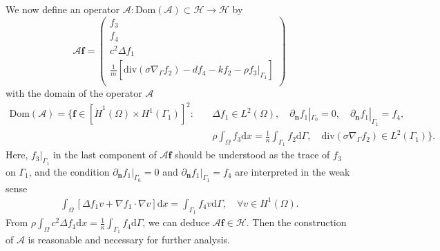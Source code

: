 \documentclass[10pt]{elsarticle}
\begin{document}
We now define an operator $\mathcal{A}: \mathrm{Dom}(\mathcal{A})\subset \mathcal{H}\rightarrow \mathcal{H}$ by
\begin{equation*}       
\mathcal{A}\mathbf{ f}=
\left(                 
  \begin{array}{c}   
    f_3\\  
    f_4\\  
    c^2\Delta f_1 \\
     \frac{1}{m}\left[\mathrm{div}(\sigma\nabla_{\Gamma}f_2) -d f_4-k f_2 -\rho f_3|_{\Gamma_1}\right] \\
  \end{array}
\right)                       
\end{equation*}
with the domain of the operator $\mathcal{A}$ 
\begin{equation*} 
\begin{split}
	\mathrm{Dom}(\mathcal{A})=\Big\{\mathbf{f}\in [\dot{H}^1(\Omega)\times H^1(\Gamma_1)]^2: & \quad \Delta f_1\in L^2(\Omega), \quad \partial_{\mathbf{n}} f_1|_{\Gamma_0}=0, \quad \partial_{\mathbf{n}} f_1|_{\Gamma_1}=f_4,\\
	&\quad  \rho\int_{\Omega}f_3 \mathrm{d}x = \frac{1}{\kappa}\int_{\Gamma_1}f_2 \mathrm{d}\Gamma, \quad \mathrm{div}(\sigma\nabla_{\Gamma}f_2)\in L^2(\Gamma_1)\Big\}.
\end{split}
\end{equation*}
Here, $ f_3|_{\Gamma_1}$ in the last component of $\mathcal{A}\mathbf{ f}$ should be understood as the trace of $f_3$ on $\Gamma_1$, and the condition $\partial_{\mathbf{n}} f_1|_{\Gamma_0}=0$ and $\partial_{\mathbf{n}} f_1|_{\Gamma_1}=f_4$ are interpreted in the weak sense
\begin{eqnarray*}
	\int_{\Omega}\left[\Delta f_1 {v} +\nabla f_1\cdot {\nabla v}\right]\mathrm{d}x =\int_{\Gamma_1}f_4{v} \mathrm{d}\Gamma,  \quad \forall v\in H^1(\Omega).
\end{eqnarray*}
From $\rho\int_{\Omega}c^2\Delta f_1\mathrm{d}x = \frac{1}{\kappa}\int_{\Gamma_1}f_4 \mathrm{d}\Gamma$, we can deduce $\mathcal{A}\mathbf{ f}\in \mathcal{H}$. Then the construction of $\mathcal{A}$ is reasonable and necessary for further analysis.
\end{document}
